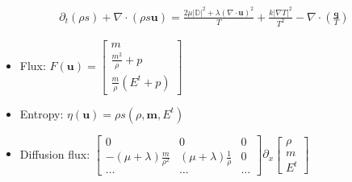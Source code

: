 \documentclass[letterpaper,10pt,english]{jupyterBook}
\begin{document}
\begin{equation*}
\begin{split}\partial_t \left( \rho s \right) + \nabla \cdot \left( \rho s \mathbf{u} \right) = \frac{2 \mu |\mathbb{D}|^2 + \lambda (\nabla \cdot \mathbf{u})^2}{T} + \frac{k |\nabla T|^2}{T^2} - \nabla \cdot \left(\frac{\mathbf{q}}{T}\right)\end{split}
\end{equation*}\begin{itemize}
\item {} 
\sphinxAtStartPar
Flux: \(F(\mathbf{u}) = \begin{bmatrix} m \\ \frac{m^2}{\rho} + p \\ \frac{m}{\rho}(E^t+p) \end{bmatrix} \)

\item {} 
\sphinxAtStartPar
Entropy: \(\eta(\mathbf{u}) = \rho s \left( \rho, \mathbf{m}, E^t \right)\)

\item {} 
\sphinxAtStartPar
Diffusion flux: \(\begin{bmatrix} 0 & 0 & 0 \\ - (\mu+\lambda) \frac{m}{\rho^2} & (\mu+\lambda) \frac{1}{\rho} & 0 \\ \dots & \dots & \dots \end{bmatrix} \partial_x \begin{bmatrix} \rho \\ m \\ E^t \end{bmatrix}\)

\end{itemize}
\end{document}
